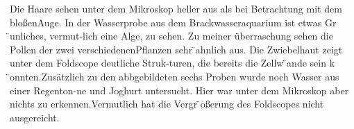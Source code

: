 Die Haare sehen unter dem Mikroskop heller aus als bei Betrachtung mit dem bloßenAuge. In der Wasserprobe aus dem Brackwasseraquarium ist etwas Gr ̈unliches, vermut-lich eine Alge, zu sehen. Zu meiner überraschung sehen die Pollen der zwei verschiedenenPflanzen sehr ̈ahnlich aus. Die Zwiebelhaut zeigt unter dem Foldscope deutliche Struk-turen, die bereits die Zellw ̈ande sein k ̈onnten.Zusätzlich zu den abbgebildeten sechs Proben wurde noch Wasser aus einer Regenton-ne  und  Joghurt  untersucht.  Hier  war  unter  dem  Mikroskop  aber  nichts  zu  erkennen.Vermutlich hat die Vergr ̈oßerung des Foldscopes nicht ausgereicht.